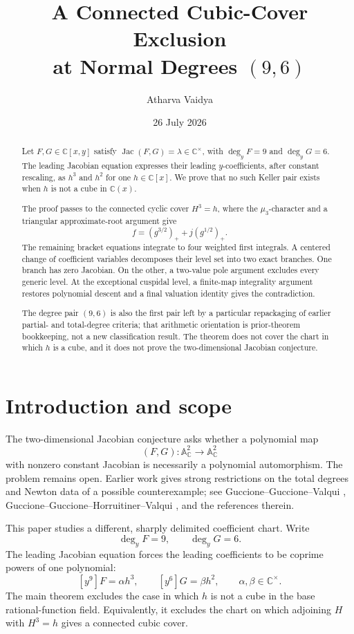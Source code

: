 \documentclass[11pt]{article}
\title{A Connected Cubic-Cover Exclusion\\
at Normal Degrees \((9,6)\)}
\author{Atharva Vaidya}
\date{26 July 2026}
\theoremstyle{definition}
\theoremstyle{remark}
\newcommand{\C}{\mathbb C}
\newcommand{\A}{\mathbb A}
\newcommand{\Jac}{\operatorname{Jac}}
\begin{document}
\maketitle

\begin{abstract}
Let \(F,G\in\C[x,y]\) satisfy
\(\Jac(F,G)=\lambda\in\C^\times\), with
\(\deg_yF=9\) and \(\deg_yG=6\).  The leading Jacobian equation
expresses their leading \(y\)-coefficients, after constant rescaling, as
\(h^3\) and \(h^2\) for one \(h\in\C[x]\).  We prove that no such Keller
pair exists when \(h\) is not a cube in \(\C(x)\).

The proof passes to the connected cyclic cover \(H^3=h\), where the
\(\mu _3\)-character and a triangular approximate-root argument give
\[
 f=(g^{3/2})_+ +j(g^{1/2})_+ .
\]
The remaining bracket equations integrate to four weighted first
integrals.  A centered change of coefficient variables decomposes their
level set into two exact branches.  One branch has zero Jacobian.  On
the other, a two-value pole argument excludes every generic level.  At
the exceptional cuspidal level, a finite-map integrality argument
restores polynomial descent and a final valuation identity gives the
contradiction.

The degree pair \((9,6)\) is also the first pair left by a particular
repackaging of earlier partial- and total-degree criteria; that
arithmetic orientation is prior-theorem bookkeeping, not a new
classification result.  The theorem does not cover the chart in which
\(h\) is a cube, and it does not prove the two-dimensional Jacobian
conjecture.
\end{abstract}

\section{Introduction and scope}

The two-dimensional Jacobian conjecture asks whether a polynomial map
\[
 (F,G):\A^2_\C\longrightarrow\A^2_\C
\]
with nonzero constant Jacobian is necessarily a polynomial
automorphism.  The problem remains open.  Earlier work gives strong
restrictions on the total degrees and Newton data of a possible
counterexample; see Guccione--Guccione--Valqui
\cite{GGVShape}, Guccione--Guccione--Horruitiner--Valqui
\cite{GGHVApprox,GGHVAlgorithms}, and the references therein.

This paper studies a different, sharply delimited coefficient chart.
Write
\[
 \deg_yF=9,\qquad \deg_yG=6.
\]
The leading Jacobian equation forces the leading coefficients to be
coprime powers of one polynomial:
\[
 [y^9]F=\alpha h^3,\qquad [y^6]G=\beta h^2,
 \qquad \alpha,\beta\in\C^\times.
\]
The main theorem excludes the case in which \(h\) is not a cube in the
base rational-function field.  Equivalently, it excludes the chart on
which adjoining \(H\) with \(H^3=h\) gives a connected cubic cover.
\end{document}
